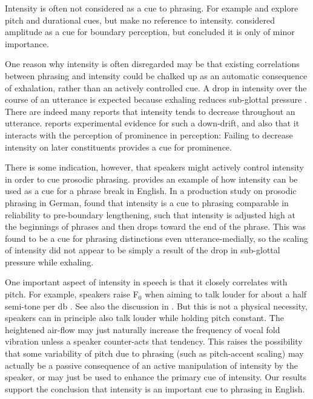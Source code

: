 \documentclass[preprint,review,12pt,authoryear,times]{elsarticle}
\begin{document}
Intensity is often not considered as a cue to phrasing. For example  \citet{price91} and \citet{wight92} explore pitch and durational cues, but make no reference to intensity. \citet{stree78} considered amplitude as a cue for boundary perception, but concluded it is only of minor importance. 

One reason why intensity is often disregarded may be that existing correlations between phrasing and intensity could be chalked up as an automatic consequence of exhalation, rather than an actively controlled cue. A drop in intensity over the course of an utterance is expected because exhaling reduces sub-glottal pressure \citep{bjork16}. There are indeed many reports that intensity tends to decrease throughout an utterance. \citet{pierr79} reports experimental evidence for such a down-drift, and also that it interacts with the perception of prominence in perception: Failing to decrease intensity on later constituents provides a cue for prominence.  

There is some indication, however, that speakers might actively control intensity in order to cue prosodic phrasing. \citet{trouv98} provides an example of how intensity can be used as a cue for a phrase break in English. In a production study on prosodic phrasing in German, \citet{poschmannwagner16} found that intensity is a cue to phrasing comparable in reliability to pre-boundary lengthening, such that intensity is adjusted high at the beginnings of phrases and then drops toward the end of the phrase. This was found to be a cue for phrasing distinctions even utterance-medially, so the scaling of intensity did not appear to be simply a result of the drop in sub-glottal pressure while exhaling.  

One important aspect of intensity in speech is that it closely correlates with pitch. For example, speakers raise F$_0$ when aiming to talk louder for about a half semi-tone per db \citep{gramm88}. See also the discussion in \citet{vaiss83}. But this is not a physical necessity, speakers can in principle also talk louder while holding pitch constant. The heightened air-flow may just naturally increase the frequency of vocal fold vibration unless a speaker counter-acts that tendency. This raises the possibility that some variability of pitch due to phrasing (such as pitch-accent scaling) may actually be a passive consequence of an active manipulation of intensity by the speaker, or may just be used to enhance the primary cue of intensity. Our results support the conclusion that intensity is an important cue to phrasing in English.
\end{document}

